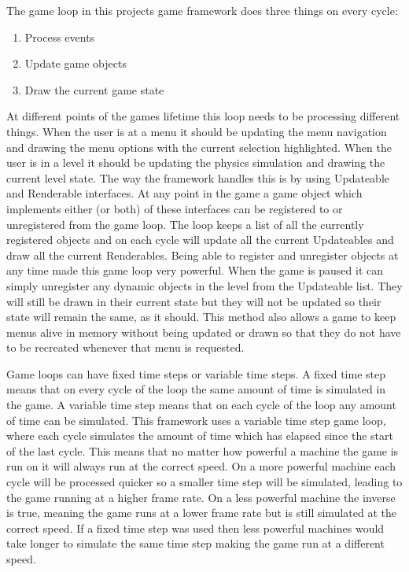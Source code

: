 \documentclass[]{report}
\begin{document}
			The game loop in this projects game framework does three things on every cycle:
			\begin{enumerate}
				\item Process events
				\item Update game objects
				\item Draw the current game state
			\end{enumerate}
			
			At different points of the games lifetime this loop needs to be processing different things. When the user is at a menu it should be updating the menu navigation and drawing the menu options with the current selection highlighted. When the user is in a level it should be updating the physics simulation and drawing the current level state. The way the framework handles this is by using Updateable and Renderable interfaces. At any point in the game a game object which implements either (or both) of these interfaces can be registered to or unregistered from the game loop. The loop keeps a list of all the currently registered objects and on each cycle will update all the current Updateables and draw all the current Renderables. Being able to register and unregister objects at any time made this game loop very powerful. When the game is paused it can simply unregister any dynamic objects in the level from the Updateable list. They will still be drawn in their current state but they will not be updated so their state will remain the same, as it should. This method also allows a game to keep menus alive in memory without being updated or drawn so that they do not have to be recreated whenever that menu is requested.
			
			Game loops can have fixed time steps or variable time steps\cite{gamepatterns}. A fixed time step means that on every cycle of the loop the same amount of time is simulated in the game. A variable time step means that on each cycle of the loop any amount of time can be simulated. This framework uses a variable time step game loop, where each cycle simulates the amount of time which has elapsed since the start of the last cycle. This means that no matter how powerful a machine the game is run on it will always run at the correct speed. On a more powerful machine each cycle will be processed quicker so a smaller time step will be simulated, leading to the game running at a higher frame rate. On a less powerful machine the inverse is true, meaning the game runs at a lower frame rate but is still simulated at the correct speed. If a fixed time step was used then less powerful machines would take longer to simulate the same time step making the game run at a different speed.
			
\end{document}
